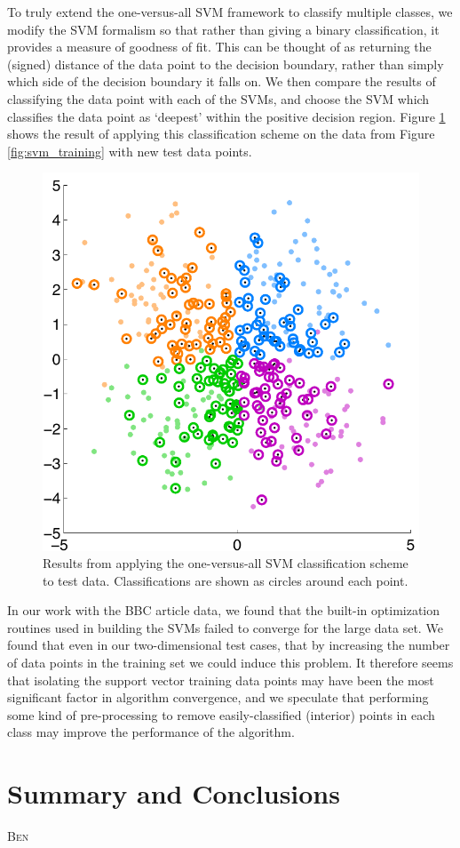 \documentclass[12pt]{article}
\newcommand{\comment}[1]{\textsc{\color[rgb]{1,0,0}#1}}
\begin{document}
To truly extend the one-versus-all SVM framework to classify multiple classes, we modify the SVM formalism so that rather than giving a binary classification, it provides a measure of goodness of fit. This can be thought of as returning the (signed) distance of the data point to the decision boundary, rather than simply which side of the decision boundary it falls on. We then compare the results of classifying the data point with each of the SVMs, and choose the SVM which classifies the data point as `deepest' within the positive decision region. Figure \ref{fig:svm_classify} shows the result of applying this classification scheme on the data from Figure \ref{fig:svm_training} with new test data points. 
\begin{figure}[H]
\centering
\includegraphics[width=.48\textwidth]{figures/svm_classification}
\caption{Results from applying the one-versus-all SVM classification scheme to test data. Classifications are shown as circles around each point.}
\label{fig:svm_classify}
\end{figure}

In our work with the BBC article data, we found that the built-in optimization routines used in building the SVMs failed to converge for the large data set. We found that even in our two-dimensional test cases, that by increasing the number of data points in the training set we could induce this problem. It therefore seems that isolating the support vector training data points may have been the most significant factor in algorithm convergence, and we speculate that performing some kind of pre-processing to remove easily-classified (interior) points in each class may improve the performance of the algorithm.

\section{Summary and Conclusions}
\comment{Ben}
\end{document}
